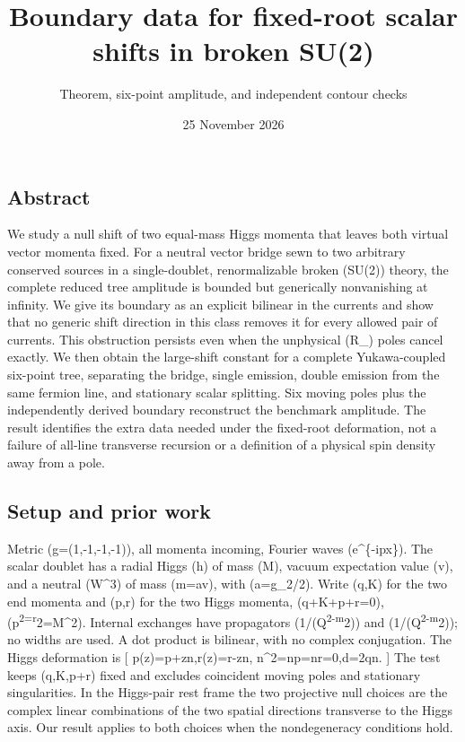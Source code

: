 \documentclass[
  11pt,
]{article}
\title{Boundary data for fixed-root scalar shifts in broken SU(2)}
\subtitle{Theorem, six-point amplitude, and independent contour checks}
\author{}
\date{25 November 2026}
\begin{document}
\maketitle

\subsection{Abstract}\label{abstract}

We study a null shift of two equal-mass Higgs momenta that leaves both
virtual vector momenta fixed. For a neutral vector bridge sewn to two
arbitrary conserved sources in a single-doublet, renormalizable broken
(SU(2)) theory, the complete reduced tree amplitude is bounded but
generically nonvanishing at infinity. We give its boundary as an
explicit bilinear in the currents and show that no generic shift
direction in this class removes it for every allowed pair of currents.
This obstruction persists even when the unphysical (R\_\xi) poles cancel
exactly. We then obtain the large-shift constant for a complete
Yukawa-coupled six-point tree, separating the bridge, single emission,
double emission from the same fermion line, and stationary scalar
splitting. Six moving poles plus the independently derived boundary
reconstruct the benchmark amplitude. The result identifies the extra
data needed under the fixed-root deformation, not a failure of all-line
transverse recursion or a definition of a physical spin density away
from a pole.

\subsection{Setup and prior work}\label{setup-and-prior-work}

Metric (g=(1,-1,-1,-1)), all momenta incoming, Fourier
waves (e\^{}\{-ipx\}). The scalar doublet has a radial Higgs (h) of mass
(M), vacuum expectation value (v), and a neutral (W\^{}3) of mass
(m=av), with (a=g\_2/2). Write (q,K) for the two end momenta and (p,r)
for the two Higgs momenta, (q+K+p+r=0),
(p\textsuperscript{2=r}2=M\^{}2). Internal exchanges have propagators
(1/(Q\textsuperscript{2-m}2)) and (1/(Q\textsuperscript{2-\xi m}2)); no
widths are used. A dot product is bilinear, with no complex conjugation.
The Higgs deformation is {[} p(z)=p+zn,\qquad r(z)=r-zn,\qquad
n\^{}2=n\cdot p=n\cdot r=0,\qquad d=2q\cdot n. {]} The test keeps
(q,K,p+r) fixed and excludes coincident moving poles and stationary
singularities. In the Higgs-pair rest frame the two projective null
choices are the complex linear combinations of the two spatial
directions transverse to the Higgs axis. Our result applies to both
choices when the nondegeneracy conditions hold.
\end{document}
